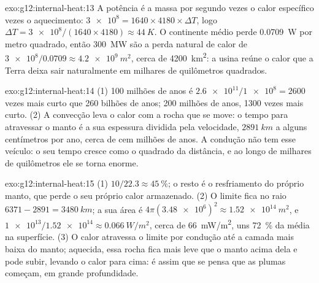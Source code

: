 \begin{solution}{exo:g12:internal-heat:13}
A potência é a massa por segundo vezes o calor específico vezes o
aquecimento: $\num{3e8} = 1640 \times 4180 \times \Delta T$, logo $\Delta T =
\num{3e8}/(1640 \times 4180) \approx \qty{44}{K}$. O continente médio perde
\qty{0.0709}{W} por metro quadrado, então \qty{300}{MW} são a perda natural
de calor de $\num{3e8}/0.0709 \approx \qty{4.2e9}{m^2}$, cerca de
\qty{4200}{km^2}: a usina reúne o calor que a Terra deixa sair naturalmente
em milhares de quilômetros quadrados.
\end{solution}

\begin{solution}{exo:g12:internal-heat:14}
(1) 100 milhões de anos é $\num{2.6e11}/\num{1e8} = 2600$ vezes mais curto
que 260 bilhões de anos; 200 milhões de anos, 1300 vezes mais curto.
(2) A convecção leva o calor com a rocha que se move: o tempo para
atravessar o manto é a sua espessura dividida pela velocidade,
$\qty{2891}{km}$ a alguns centímetros por ano, cerca de cem milhões de anos.
A condução não tem esse veículo: o seu tempo cresce como o quadrado da
distância, e ao longo de milhares de quilômetros ele se torna enorme.
\end{solution}

\begin{solution}{exo:g12:internal-heat:15}
(1) $10/22.3 \approx \qty{45}{\percent}$; o resto é o resfriamento do próprio
manto, que perde o seu próprio calor armazenado. (2) O limite fica no raio
$6371 - 2891 =
\qty{3480}{km}$; a sua área é $4\pi (\num{3.48e6})^2 \approx
\qty{1.52e14}{m^2}$, e $\num{1e13}/\num{1.52e14} \approx
\qty{0.066}{W/m^2}$, cerca de \qty{66}{mW/m^2}, uns \qty{72}{\percent} da
média na superfície. (3) O calor atravessa o limite por condução até a
camada mais baixa do manto; aquecida, essa rocha fica mais leve que o manto
acima dela e pode subir, levando o calor para cima: é assim que se pensa
que as plumas começam, em grande profundidade.
\end{solution}

